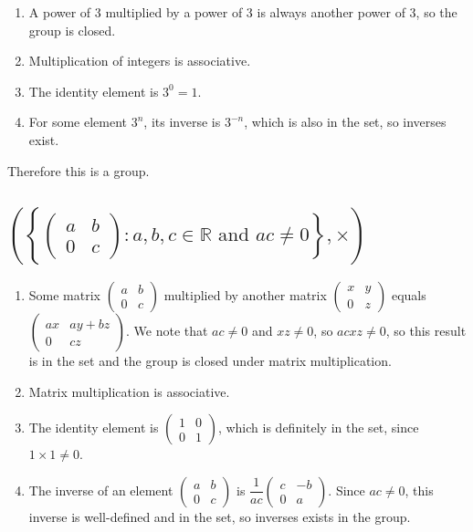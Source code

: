 \documentclass[a4paper]{article}
\begin{document}
\begin{enumerate}
	\item A power of 3 multiplied by a power of 3 is always another power of 3, so the group is closed.
	\item Multiplication of integers is associative.
	\item The identity element is $3^0 = 1$.
	\item For some element $3^n$, its inverse is $3^{-n}$, which is also in the set, so inverses exist.
\end{enumerate}

Therefore this is a group.

\subsection{$\left( \left\{ \begin{pmatrix}a & b\\ 0 & c\end{pmatrix} : a, b, c \in \mathbb R \text{ and } ac \ne 0 \right\}, \times \right)$}

\begin{enumerate}
	\item Some matrix $\begin{pmatrix}a & b\\ 0 & c\end{pmatrix}$ multiplied by another matrix $\begin{pmatrix}x & y\\ 0 & z\end{pmatrix}$ equals $\begin{pmatrix}ax & ay + bz\\ 0 & cz\end{pmatrix}$. We note that $ac \ne 0$ and $xz \ne 0$, so $acxz \ne 0$, so this result is in the set and the group is closed under matrix multiplication.
	\item Matrix multiplication is associative.
	\item The identity element is $\begin{pmatrix}1 & 0\\ 0 & 1\end{pmatrix}$, which is definitely in the set, since $1 \times 1 \ne 0$.
	\item The inverse of an element $\begin{pmatrix}a & b\\ 0 & c\end{pmatrix}$ is $\dfrac1{ac} \begin{pmatrix}c & -b\\ 0 & a\end{pmatrix}$. Since $ac \ne 0$, this inverse is well-defined and in the set, so inverses exists in the group.
\end{enumerate}
\end{document}
